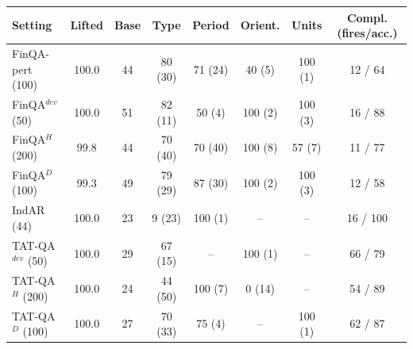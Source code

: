 \begin{tabular}{lccccccc}
\toprule
Setting & Lifted & Base & Type & Period & Orient. & Units & Compl. (fires/acc.) \\
\midrule
FinQA-pert (100) & 100.0 & 44 & 80 (30) & 71 (24) & 40 (5) & 100 (1) & 12 / 64 \\
FinQA$^{dev}$ (50) & 100.0 & 51 & 82 (11) & 50 (4) & 100 (2) & 100 (3) & 16 / 88 \\
FinQA$^{H}$ (200) & 99.8 & 44 & 70 (40) & 70 (40) & 100 (8) & 57 (7) & 11 / 77 \\
FinQA$^{D}$ (100) & 99.3 & 49 & 79 (29) & 87 (30) & 100 (2) & 100 (3) & 12 / 58 \\
IndAR (44) & 100.0 & 23 & 9 (23) & 100 (1) & -- & -- & 16 / 100 \\
TAT-QA$^{dev}$ (50) & 100.0 & 29 & 67 (15) & -- & 100 (1) & -- & 66 / 79 \\
TAT-QA$^{H}$ (200) & 100.0 & 24 & 44 (50) & 100 (7) & 0 (14) & -- & 54 / 89 \\
TAT-QA$^{D}$ (100) & 100.0 & 27 & 70 (33) & 75 (4) & -- & 100 (1) & 62 / 87 \\
\bottomrule
\end{tabular}
